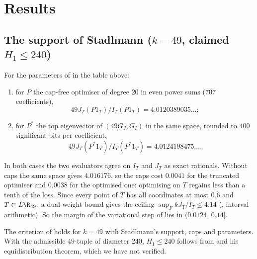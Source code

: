 \section{Results}

\subsection*{The support of Stadlmann ($k=49$, claimed $H_1\le240$)}

\begin{theorem}\label{thm:240}
For the parameters of \cite{Sta26} in the table above:
\begin{enumerate}
\item for $P$ the cap-free optimiser of degree $20$ in even power sums
($707$ coefficients),
\[49J_T(P1_T)/I_T(P1_T)=4.0120389035\ldots;\]
\item for $P^\ast$ the top eigenvector of $(49G_J,G_I)$ in the same space,
rounded to $400$ significant bits per coefficient,
\[49J_T(P^\ast1_T)/I_T(P^\ast1_T)=4.0124198475\ldots.\]
\end{enumerate}
\end{theorem}

In both cases the two evaluators agree on $I_T$ and $J_T$ as exact rationals.
Without caps the same space gives $4.016176$, so the caps cost $0.0041$ for the
truncated optimiser and $0.0038$ for the optimised one: optimising on $T$
regains less than a tenth of the loss. Since every point of $T$ has all
coordinates at most $0.6$ and $T\subset L\R_{49}$, a dual-weight bound gives
the ceiling $\sup_FkJ_T/I_T\le4.14$ (, interval arithmetic). So
the margin of the variational step of \cite{Sta26} lies in $(0.0124,\,0.14]$.

\begin{corollary}
The criterion of \cite[Prop.~1]{Sta26} holds for $k=49$ with Stadlmann's
support, caps and parameters. With the  admissible
$49$-tuple of diameter $240$, $H_1\le240$ follows from \cite[Prop.~1]{Sta26}
and his equidistribution theorem, which we have not verified.
\end{corollary}

